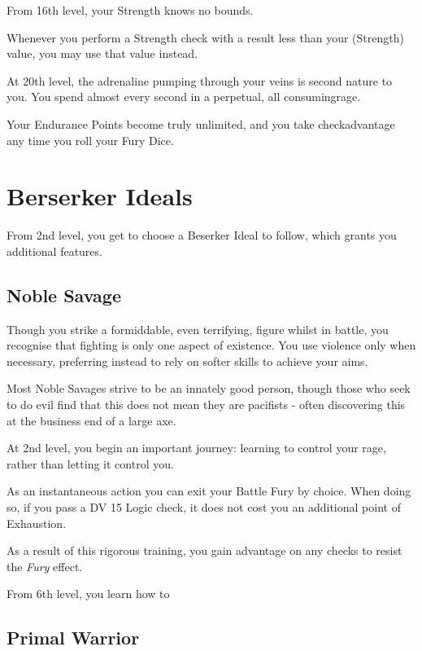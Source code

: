 {
	From 16th level, your Strength knows no bounds. 
	
	Whenever you perform a Strength check with a result less than your \attPhys{} (Strength) value, you may use that value instead. 
}

{
	At 20th level, the adrenaline pumping through your veins is second nature to you. You spend almost every second in a perpetual, all consuming\minus{}rage. 
	
	Your Endurance Points become truly unlimited, and you take check\minus{}advantage any time you roll your Fury Dice. 
}


\section*{Berserker Ideals}

From 2nd level, you get to choose a Beserker Ideal to follow, which grants you additional features. 

\subsection*{Noble Savage}

Though you strike a formiddable, even terrifying, figure whilst in battle, you recognise that fighting is only one aspect of existence. You use violence only when necessary, preferring instead to rely on softer skills to achieve your aims. 

Most Noble Savages strive to be an innately good person, though those who seek to do evil find that this does not mean they are pacifists - often discovering this at the business end of a large axe. 


{
	At 2nd level, you begin an important journey: learning to control your rage, rather than letting it control you. 
	
	As an instantaneous action you can exit your Battle Fury by choice. When doing so, if you pass a DV 15 Logic check, it does not cost you an additional point of Exhaustion.

	As a result of this rigorous training, you gain advantage on any checks to resist the {\it Fury} effect. 
}



From 6th level, you learn how to 

\subsection*{Primal Warrior}

